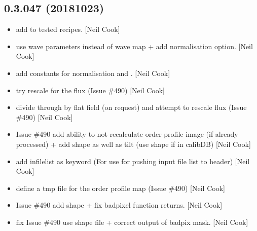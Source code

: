\documentclass[a4paper,10pt,english]{report}
\begin{document}
\subsection{0.3.047 (2018\sphinxhyphen{}10\sphinxhyphen{}23)}
\label{\detokenize{misc/changelog:id304}}\begin{itemize}
\item {} 
 \sphinxhyphen{} add  to tested recipes. {[}Neil Cook{]}

\item {} 
 \sphinxhyphen{} use wave parameters instead of wave map +
add normalisation option. {[}Neil Cook{]}

\item {} 
 \sphinxhyphen{} add constants for normalisation and
. {[}Neil Cook{]}

\item {} 
 \sphinxhyphen{} try rescale for the flux (Issue \#490) {[}Neil
Cook{]}

\item {} 
 \sphinxhyphen{} divide through by flat field (on request) and
attempt to rescale flux (Issue \#490) {[}Neil Cook{]}

\item {} 
 \sphinxhyphen{} Issue \#490 \sphinxhyphen{} add ability to not re\sphinxhyphen{}calculate
order profile image (if already processed) + add shape as well as tilt
(use shape if in calibDB) {[}Neil Cook{]}

\item {} 
 \sphinxhyphen{} add infilelist as keyword (For use for pushing
input file list to header) {[}Neil Cook{]}

\item {} 
 \sphinxhyphen{} define a tmp file for the order profile map (Issue
\#490) {[}Neil Cook{]}

\item {} 
 \sphinxhyphen{} Issue \#490 \sphinxhyphen{} add shape + fix badpixel function
returns. {[}Neil Cook{]}

\item {} 
 \sphinxhyphen{} fix Issue \#490 \sphinxhyphen{} use shape file + correct
output of badpix mask. {[}Neil Cook{]}

\end{itemize}
\end{document}
